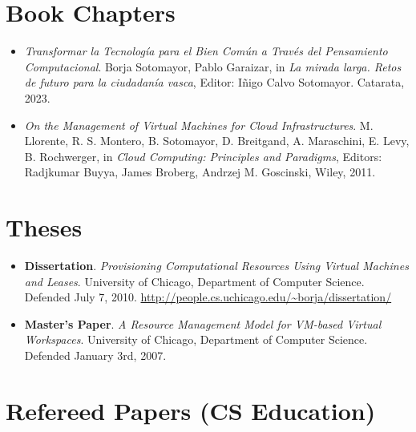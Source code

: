 \documentclass[11pt,letterpaper,sans]{moderncv}
\begin{document}
\section{Book Chapters}

\begin{itemize}
\item \emph{Transformar la Tecnolog\'ia para el Bien Com\'un a Trav\'es del Pensamiento Computacional}. Borja Sotomayor, Pablo Garaizar, in \emph{La mirada larga. Retos de futuro para la ciudadan\'ia vasca}, Editor: I\~nigo Calvo Sotomayor. Catarata, 2023.
\item \emph{On the Management of Virtual Machines for Cloud Infrastructures}. M. Llorente, R. S. Montero, B. Sotomayor, D. Breitgand, A. Maraschini, E. Levy, B. Rochwerger, in \emph{Cloud Computing: Principles and Paradigms}, Editors: Radjkumar Buyya, James Broberg, Andrzej M. Goscinski, Wiley, 2011.
\end{itemize}

\section{Theses}

\begin{itemize}
\item \textbf{Dissertation}. \emph{Provisioning Computational Resources Using Virtual Machines and Leases}. University of Chicago, Department of Computer Science. Defended July 7, 2010. \url{http://people.cs.uchicago.edu/~borja/dissertation/}
\item \textbf{Master's Paper}. \emph{A Resource Management Model for VM-based Virtual Workspaces}. University of Chicago, Department of Computer Science. Defended January 3rd, 2007.
\end{itemize}

\section{Refereed Papers (CS Education)}
\end{document}
